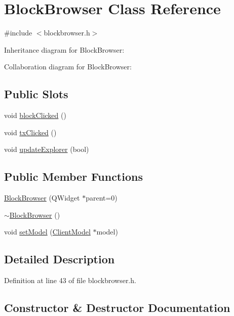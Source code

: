 \hypertarget{class_block_browser}{}\section{Block\+Browser Class Reference}
\label{class_block_browser}


{\ttfamily \#include $<$blockbrowser.\+h$>$}



Inheritance diagram for Block\+Browser\+:


Collaboration diagram for Block\+Browser\+:
\subsection*{Public Slots}
\begin{DoxyCompactItemize}
\item 
void \hyperlink{class_block_browser_a385f5e10646d9beebaba18e64f167888}{block\+Clicked} ()
\item 
void \hyperlink{class_block_browser_ae99275319759f5812adaada35dbc5e50}{tx\+Clicked} ()
\item 
void \hyperlink{class_block_browser_ad6d698399c521b503106f1d768a76f32}{update\+Explorer} (bool)
\end{DoxyCompactItemize}
\subsection*{Public Member Functions}
\begin{DoxyCompactItemize}
\item 
\hyperlink{class_block_browser_aaabcd986f78a79e0e65dce85e9cabb1a}{Block\+Browser} (Q\+Widget $\ast$parent=0)
\item 
\hyperlink{class_block_browser_ae9435339ce465a054636210b9abc0d5f}{$\sim$\+Block\+Browser} ()
\item 
void \hyperlink{class_block_browser_a2706e5abfeaccd5e97ebd0788fba4859}{set\+Model} (\hyperlink{class_client_model}{Client\+Model} $\ast$model)
\end{DoxyCompactItemize}


\subsection{Detailed Description}


Definition at line 43 of file blockbrowser.\+h.



\subsection{Constructor \& Destructor Documentation}
\hypertarget{class_block_browser_aaabcd986f78a79e0e65dce85e9cabb1a}{}
